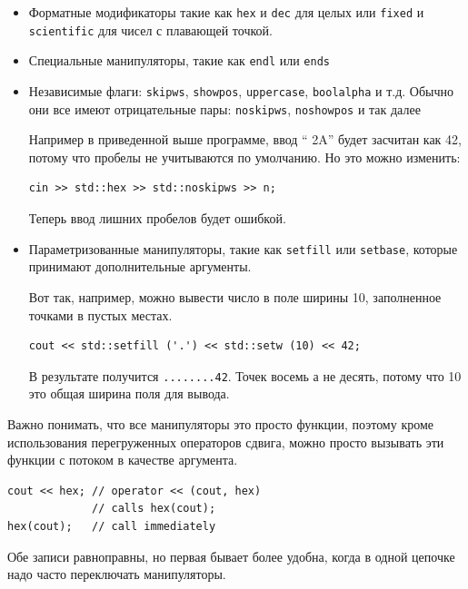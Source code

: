 \documentclass[a4paper,12pt,oneside]{article}
\begin{document}
\begin{itemize}
\item Форматные модификаторы такие как \lstinline!hex! и \lstinline!dec! для целых или \lstinline!fixed! и \lstinline!scientific! для чисел с плавающей точкой.

\item Специальные манипуляторы, такие как \lstinline!endl! или \lstinline!ends!

\item Независимые флаги: \lstinline!skipws!, \lstinline!showpos!, \lstinline!uppercase!, \lstinline!boolalpha! и т.д. Обычно они все имеют отрицательные пары: \lstinline!noskipws!, \lstinline!noshowpos! и так далее

Например в приведенной выше программе, ввод ``  2A'' будет засчитан как 42, потому что пробелы не учитываются по умолчанию. Но это можно изменить:

\begin{lstlisting}
cin >> std::hex >> std::noskipws >> n;
\end{lstlisting}

Теперь ввод лишних пробелов будет ошибкой.

\item Параметризованные манипуляторы, такие как \lstinline!setfill! или \lstinline!setbase!, которые принимают дополнительные аргументы.

Вот так, например, можно вывести число в поле ширины 10, заполненное точками в пустых местах.

\begin{lstlisting}
cout << std::setfill ('.') << std::setw (10) << 42;
\end{lstlisting}

В результате получится \lstinline!........42!. Точек восемь а не десять, потому что 10 это общая ширина поля для вывода.

\end{itemize}

Важно понимать, что все манипуляторы это просто функции, поэтому кроме использования перегруженных операторов сдвига, можно просто вызывать эти функции с потоком в качестве аргумента.

\begin{lstlisting}
cout << hex; // operator << (cout, hex)
             // calls hex(cout);
hex(cout);   // call immediately
\end{lstlisting}

Обе записи равноправны, но первая бывает более удобна, когда в одной цепочке надо часто переключать манипуляторы.
\end{document}
